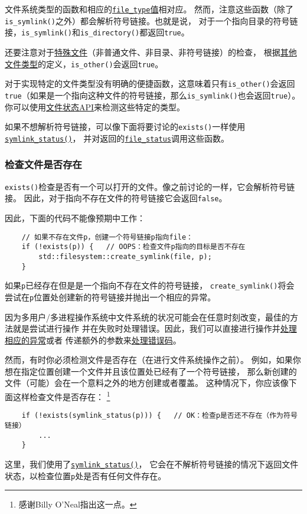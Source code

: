文件系统类型的函数和相应的\hyperref[ch20.2.7]{\texttt{file\_type}值}相对应。
然而，注意这些函数（除了\texttt{is\_symlink()}之外）都会解析符号链接。也就是说，
对于一个指向目录的符号链接，\texttt{is\_symlink()}和\texttt{is\_directory()}都返回\texttt{true}。

还要注意对于\hyperref[文件类型]{特殊文件}（非普通文件、非目录、非符号链接）的检查，
根据\hyperref[文件类型]{其他文件类型}的定义，\texttt{is\_other()}会返回\texttt{true}。

对于实现特定的文件类型没有明确的便捷函数，这意味着只有\texttt{is\_other()}会返回
\texttt{true}（如果是一个指向这种文件的符号链接，那么\texttt{is\_symlink()}也会返回\texttt{true}）。
你可以使用\hyperref[ch20.4.2]{文件状态API}来检测这些特定的类型。

如果不想解析符号链接，可以像下面将要讨论的\texttt{exists()}一样使用\hyperref[t20.12]{\texttt{symlink\_status()}}，
并对返回的\hyperref[ch20.4.2]{\texttt{file\_status}}调用这些函数。

\subsubsection{检查文件是否存在}\label{ch20.4.1.1}
\texttt{exists()}检查是否有一个可以打开的文件。像之前讨论的一样，它会解析符号链接。
因此，对于指向不存在文件的符号链接它会返回\texttt{false}。

因此，下面的代码不能像预期中工作：
\begin{lstlisting}
    // 如果不存在文件p，创建一个符号链接p指向file：
    if (!exists(p)) {   // OOPS：检查文件p指向的目标是否不存在
        std::filesystem::create_symlink(file, p);
    }
\end{lstlisting}
如果\texttt{p}已经存在但是是一个指向不存在文件的符号链接，
\texttt{create\_symlink()}将会尝试在\texttt{p}位置处创建新的符号链接并抛出一个相应的异常。

因为多用户/多进程操作系统中文件系统的状况可能会在任意时刻改变，最佳的方法就是尝试进行操作
并在失败时处理错误。因此，我们可以直接进行操作并\hyperref[ch20.2.6.1]{处理相应的异常}或者
传递额外的参数来\hyperref[ch20.2.6.2]{处理错误码}。

然而，有时你必须检测文件是否存在（在进行文件系统操作之前）。
例如，如果你想在指定位置创建一个文件并且该位置处已经有了一个符号链接，
那么新创建的文件（可能）会在一个意料之外的地方创建或者覆盖。
这种情况下，你应该像下面这样检查文件是否存在：
\footnote{感谢Billy O’Neal指出这一点。}
\begin{lstlisting}
    if (!exists(symlink_status(p))) {   // OK：检查p是否还不存在（作为符号链接）
        ...
    }
\end{lstlisting}
这里，我们使用了\hyperref[t20.12]{\texttt{symlink\_status()}}，
它会在不解析符号链接的情况下返回文件状态，以检查位置\texttt{p}处是否有任何文件存在。

